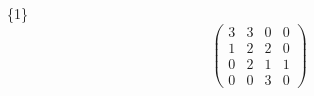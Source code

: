 \documentclass[12pt,reqno]{amsart}
\begin{document}
\Large
\{1\}                             $$ \begin{pmatrix} 
                           3 & 3 & 0 & 0 \\[6pt]
                           1 & 2 & 2 & 0 \\[6pt]
                           0 & 2 & 1 & 1 \\[6pt]
                             0 & 0 & 3 & 0
                              \end{pmatrix} $$ 
\end{document}
